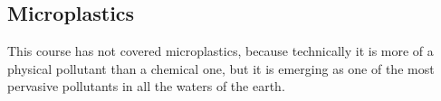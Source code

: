 \documentclass[a4paper,titlepage]{article}
\begin{document}





\subsection{Microplastics}

This course has not covered microplastics, because technically it is more of a physical pollutant than a chemical one, but it is emerging as one of the most pervasive pollutants in all the waters of the earth. 
\end{document}

